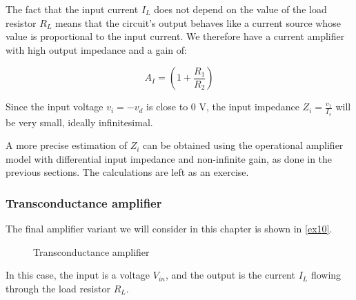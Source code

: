 \documentclass[../main.tex]{subfiles}
\begin{document}
The fact that the input current $I_L$ does not depend on the value of the load resistor $R_L$ means that the circuit’s output behaves like a current source whose value is proportional to the input current. We therefore have a current amplifier with high output impedance and a gain of:

\begin{equation}
	A_I = \left( 1 + \frac{R_1}{R_2} \right)
\end{equation}

Since the input voltage $v_i = -v_d$ is close to 0 V, the input impedance $Z_i = \frac{v_1}{I_s}$ will be very small, ideally infinitesimal. 

A more precise estimation of $Z_i$ can be obtained using the operational amplifier model with differential input impedance and non-infinite gain, as done in the previous sections. The calculations are left as an exercise. %





\subsubsection{Transconductance amplifier}


The final amplifier variant we will consider in this chapter is shown in \autoref{ex10}. 

\begin{figure}
\begin{center}



\label{ex10}
\caption{Transconductance amplifier}	
\end{center}	
\end{figure}


In this case, the input is a voltage $V_{in}$, and the output is the current $I_L$ flowing through the load resistor $R_L$.
\end{document}
